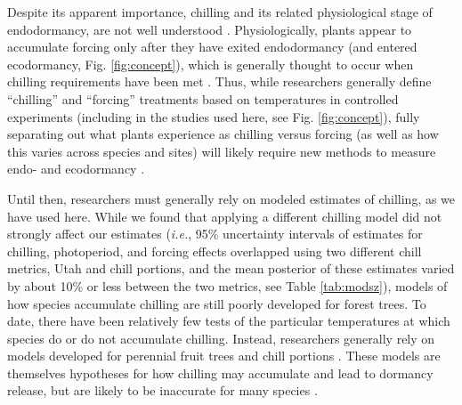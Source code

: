 \documentclass{article}
\begin{document}
\par Despite its apparent importance, chilling and its related physiological stage of endodormancy, are not well understood \emph{\citep{chuine2016}}. Physiologically, plants appear to accumulate forcing only after they have exited endodormancy (and entered ecodormancy, Fig. \ref{fig:concept}), which is generally thought to occur when chilling requirements have been met \emph{\citep{chuine2016}}. Thus, while researchers generally define ``chilling'' and ``forcing'' treatments based on temperatures in controlled experiments (including in the studies used here, see Fig. \ref{fig:concept}), fully separating out what plants experience as chilling versus forcing (as well as how this varies across species and sites) will likely require new methods to measure endo- and ecodormancy \emph{\citep{vanderschoot2014}}. 

\par Until then, researchers must generally rely on modeled estimates of chilling, as we have used here. While we found that applying a different chilling model did not strongly affect our estimates (\emph{i.e.}, 95\% uncertainty intervals of estimates for chilling, photoperiod, and forcing effects overlapped using two different chill metrics, Utah and chill portions, and the mean posterior of these estimates varied by about 10\% or less between the two metrics, see Table \ref{tab:modsz}), models of how species accumulate chilling are still poorly developed for forest trees. To date, there have been relatively few tests of the particular temperatures at which species do or do not accumulate chilling. Instead, researchers generally rely on models developed for perennial fruit trees \emph{\citep[i.e., ][]{richardson1974}} and chill portions \emph{\citep{fishman1987}}. These models are themselves hypotheses for how chilling may accumulate and lead to dormancy release, but are likely to be inaccurate for many species \emph{\citep{dennis2003}}. 
\end{document}
